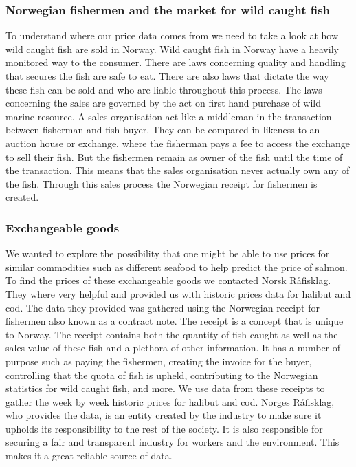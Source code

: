 \subsubsection{Norwegian fishermen and the market for wild caught fish}\label{Norwegian fishermen and the market for wild caught fish}
To understand where our price data comes from we need to take a look at how wild caught fish are sold in Norway. Wild caught fish in Norway have a heavily monitored way to the consumer. There are laws concerning quality and handling that secures the fish are safe to eat. There are also laws that dictate the way these fish can be sold and who are liable throughout this process. The laws concerning the sales are governed by the act on first hand purchase of wild marine resource. A sales organisation act like a middleman in the transaction between fisherman and fish buyer. They can be compared in likeness to an auction house or exchange, where the fisherman pays a fee to access the exchange to sell their fish. But the fishermen remain as owner of the fish until the time of the transaction. This means that the sales organisation never actually own any of the fish. Through this sales process the Norwegian receipt for fishermen is created.\parencite{Nielsen_2022}

\subsubsection{Exchangeable goods}\label{Exchangeable goods}
We wanted to explore the possibility that one might be able to use prices for similar commodities such as different seafood to help predict the price of salmon. To find the prices of these exchangeable goods we contacted Norsk Råfisklag. They where very helpful and provided us with historic prices data for halibut and cod. The data they provided was gathered using the Norwegian receipt for fishermen also known as a contract note. The receipt is a concept that is unique to Norway. The receipt contains both the quantity of fish caught as well as the sales value of these fish and a plethora of other information. It has a number of purpose such as paying the fishermen, creating the invoice for the buyer, controlling that the quota of fish is upheld, contributing to the Norwegian statistics for wild caught fish, and more. We use data from these receipts to gather the week by week historic prices for halibut and cod. Norges Råfisklag, who provides the data, is an entity created by the industry to make sure it upholds its responsibility to the rest of the society. It is also responsible for securing a fair and transparent industry for workers and the environment. This makes it a great reliable source of data.\parencite{Harland_2022}

